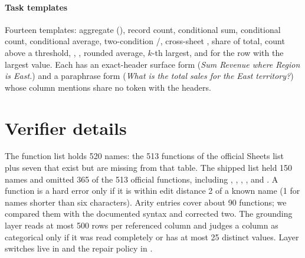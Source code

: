 \paragraph{Task templates}
Fourteen templates: aggregate (), record count, conditional sum, conditional count, conditional average, two-condition /, cross-sheet , share of total, count above a threshold, , , rounded average, $k$-th largest, and  for the row with the largest value. Each has an exact-header surface form (\emph{Sum Revenue where Region is East.}) and a paraphrase form (\emph{What is the total sales for the East territory?}) whose column mentions share no token with the headers.



\section{Verifier details}
\label{app:verifier}

The function list holds 520 names: the 513 functions of the official Sheets list~\cite{googlefunctions} plus seven that exist but are missing from that table. The shipped list held 150 names and omitted 365 of the 513 official functions, including , , , ,  and . A function is a hard error only if it is within edit distance 2 of a known name (1 for names shorter than six characters). Arity entries cover about 90 functions; we compared them with the documented syntax and corrected two. The grounding layer reads at most 500 rows per referenced column and judges a column as categorical only if it was read completely or has at most 25 distinct values. Layer switches live in  and the repair policy in .


